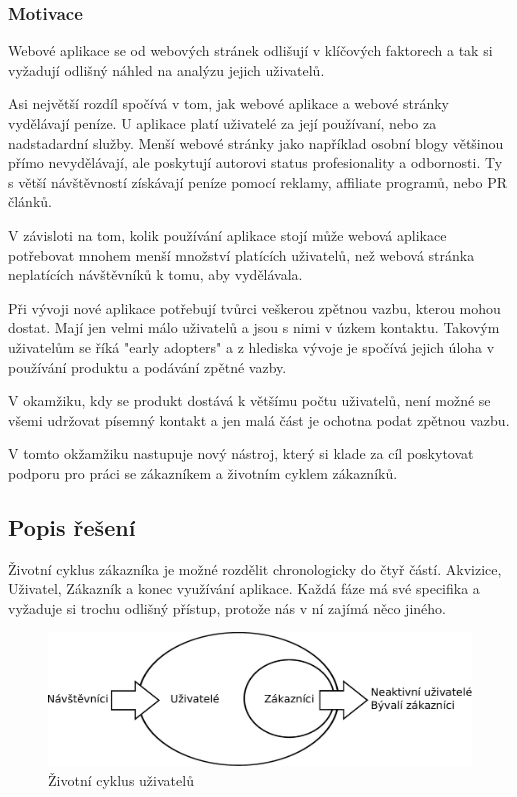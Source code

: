 \documentclass[bc,female,java,dept456]{diploma}						%
\begin{document}
\subsubsection{Motivace}

Webové aplikace se od webových stránek odlišují v klíčových faktorech a tak si vyžadují odlišný náhled na analýzu jejich uživatelů. 

Asi největší rozdíl spočívá v tom, jak webové aplikace a webové stránky vydělávají peníze. U aplikace platí uživatelé za její používaní, nebo za nadstadardní služby. Menší webové stránky jako například osobní blogy většinou přímo nevydělávají, ale poskytují autorovi status profesionality a odbornosti. Ty s větší návštěvností získávají peníze pomocí reklamy, affiliate programů, nebo PR článků.

V závisloti na tom, kolik používání aplikace stojí může webová aplikace potřebovat mnohem menší množství platících uživatelů, než webová stránka neplatících návštěvníků k tomu, aby vydělávala. 

Při vývoji nové aplikace potřebují tvůrci veškerou zpětnou vazbu, kterou mohou dostat. Mají jen velmi málo uživatelů a jsou s nimi v úzkem kontaktu. Takovým uživatelům se říká "early adopters" a z hlediska vývoje je spočívá jejich úloha v používání produktu a podávání zpětné vazby. 

V okamžiku, kdy se produkt dostává k většímu počtu uživatelů, není možné se všemi udržovat písemný kontakt a jen malá část je ochotna podat zpětnou vazbu. 

V tomto okžamžiku nastupuje nový nástroj, který si klade za cíl poskytovat podporu pro práci se zákazníkem a životním cyklem zákazníků.


\subsection{Popis řešení} %

Životní cyklus zákazníka je možné rozdělit chronologicky do čtyř částí. Akvizice, Uživatel, Zákazník a konec využívání aplikace. Každá fáze má své specifika a vyžaduje si trochu odlišný přístup, protože nás v ní zajímá něco jiného.

\begin{figure}[h]
	\centering
	\includegraphics[width=14cm]{img/user_lifecycle_slim.pdf}
	\caption{Životní cyklus uživatelů}
	\label{lifecycle}
\end{figure}
\end{document}
